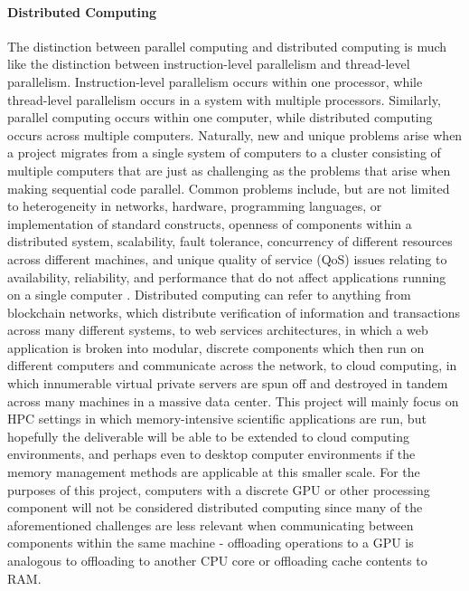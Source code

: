 \paragraph{Distributed Computing}
The distinction between parallel computing and distributed computing is much like the distinction between instruction-level parallelism and thread-level parallelism.  Instruction-level parallelism occurs within one processor, while thread-level parallelism occurs in a system with multiple processors. Similarly, parallel computing occurs within one computer, while distributed computing occurs across multiple computers. Naturally, new and unique problems arise when a project migrates from a single system of computers to a cluster consisting of multiple computers that are just as challenging as the problems that arise when making sequential code parallel. Common problems include, but are not limited to heterogeneity in networks, hardware, programming languages, or implementation of standard constructs, openness of components within a distributed system, scalability, fault tolerance, concurrency of different resources across different machines, and unique quality of service (QoS) issues relating to availability, reliability, and performance that do not affect applications running on a single computer \cite{dist_systems_concepts}. Distributed computing can refer to anything from blockchain networks, which distribute verification of information and transactions across many different systems, to web services architectures, in which a web application is broken into modular, discrete components which then run on different computers and communicate across the network, to cloud computing, in which innumerable virtual private servers are spun off and destroyed in tandem across many machines in a massive data center. This project will mainly focus on HPC settings in which memory-intensive scientific applications are run, but hopefully the deliverable will be able to be extended to cloud computing environments, and perhaps even to desktop computer environments if the memory management methods are applicable at this smaller scale. For the purposes of this project, computers with a discrete GPU or other processing component will not be considered distributed computing since many of the aforementioned challenges are less relevant when communicating between components within the same machine - offloading operations to a GPU is analogous to offloading to another CPU core or offloading cache contents to RAM.  
\newpage
